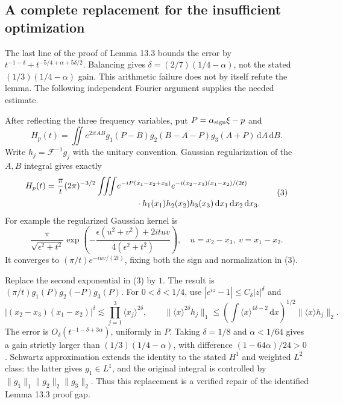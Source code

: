 \documentclass[10pt]{article}
\begin{document}
\subsection*{A complete replacement for the insufficient optimization}
The last line of the proof of Lemma 13.3 bounds the error by \(t^{-1-\delta}+t^{-5/4+\alpha+5\delta/2}\). Balancing gives \(\delta=(2/7)(1/4-\alpha)\), not the stated \((1/3)(1/4-\alpha)\) gain. This arithmetic failure does not by itself refute the lemma. The following independent Fourier argument supplies the needed estimate.\par
After reflecting the three frequency variables, put \(P=\alpha_{\rm sign}\xi-p\) and \[H_p(t)=\iint e^{2itAB}
  g_1(P-B)g_2(B-A-P)g_3(A+P)\,\mathrm dA\,\mathrm dB.\] Write \(h_j=\mathcal F^{-1}g_j\) with the unitary convention. Gaussian regularization of the \(A,B\) integral gives exactly \[\begin{split}
 H_p(t)=\frac{\pi}{t}(2\pi)^{-3/2}
 \iiint &e^{-iP(x_1-x_2+x_3)}
 e^{-i(x_2-x_3)(x_1-x_2)/(2t)}\\
 &\hspace{8mm}\cdot h_1(x_1)h_2(x_2)h_3(x_3)
                  \,\mathrm dx_1\,\mathrm dx_2\,\mathrm dx_3 .
 \end{split}
 \tag{3}\] For example the regularized Gaussian kernel is \[\frac{\pi}{\sqrt{\epsilon^2+t^2}}
 \exp\!\left(
 -\frac{\epsilon(u^2+v^2)+2ituv}
        {4(\epsilon^2+t^2)}\right),
 \quad u=x_2-x_3,\ v=x_1-x_2.\] It converges to \((\pi/t)e^{-iuv/(2t)}\), fixing both the sign and normalization in (3).\par
Replace the second exponential in (3) by \(1\). The result is \((\pi/t)g_1(P)g_2(-P)g_3(P)\). For \(0<\delta<1/4\), use \(|e^{iz}-1|\le C_\delta|z|^\delta\) and \[|(x_2-x_3)(x_1-x_2)|^\delta
 \lesssim\prod_{j=1}^3\langle x_j\rangle^{2\delta},
 \qquad
 \|\langle x\rangle^{2\delta}h_j\|_1
 \le
 \left(\int\langle x\rangle^{4\delta-2}\,\mathrm dx\right)^{1/2}
 \|\langle x\rangle h_j\|_2 .\] The error is \(O_\delta(t^{-1-\delta+3\alpha})\), uniformly in \(P\). Taking \(\delta=1/8\) and \(\alpha<1/64\) gives a gain strictly larger than \((1/3)(1/4-\alpha)\), with difference \((1-64\alpha)/24>0\). Schwartz approximation extends the identity to the stated \(H^1\) and weighted \(L^2\) class: the latter gives \(g_1\in L^1\), and the original integral is controlled by \(\|g_1\|_1\|g_2\|_2\|g_3\|_2\). Thus this replacement is a verified repair of the identified Lemma 13.3 proof gap.\par
\end{document}
